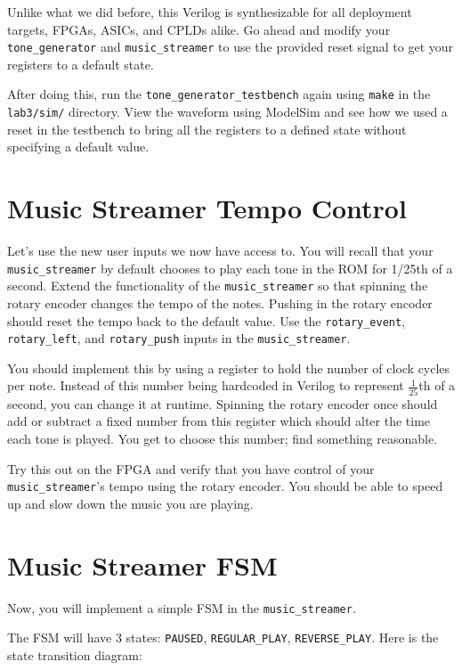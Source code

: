 \documentclass[11pt]{article}
\begin{document}
Unlike what we did before, this Verilog is synthesizable for all deployment targets, FPGAs, ASICs, and CPLDs alike. Go ahead and modify your \verb|tone_generator| and \verb|music_streamer| to use the provided reset signal to get your registers to a default state.

After doing this, run the \verb|tone_generator_testbench| again using \verb|make| in the \verb|lab3/sim/| directory. View the waveform using ModelSim and see how we used a reset in the testbench to bring all the registers to a defined state without specifying a default value.

\section{Music Streamer Tempo Control}
Let's use the new user inputs we now have access to. You will recall that your \verb|music_streamer| by default chooses to play each tone in the ROM for 1/25th of a second. Extend the functionality of the \verb|music_streamer| so that spinning the rotary encoder changes the tempo of the notes. Pushing in the rotary encoder should reset the tempo back to the default value. Use the \verb|rotary_event|, \verb|rotary_left|, and \verb|rotary_push| inputs in the \verb|music_streamer|.

You should implement this by using a register to hold the number of clock cycles per note. Instead of this number being hardcoded in Verilog to represent $\frac{1}{25}$th of a second, you can change it at runtime. Spinning the rotary encoder once should add or subtract a fixed number from this register which should alter the time each tone is played. You get to choose this number; find something reasonable.

Try this out on the FPGA and verify that you have control of your \verb|music_streamer|'s tempo using the rotary encoder. You should be able to speed up and slow down the music you are playing.

\section{Music Streamer FSM}
Now, you will implement a simple FSM in the \verb|music_streamer|.

The FSM will have 3 states: \verb|PAUSED|, \verb|REGULAR_PLAY|, \verb|REVERSE_PLAY|. Here is the state transition diagram:
\end{document}
